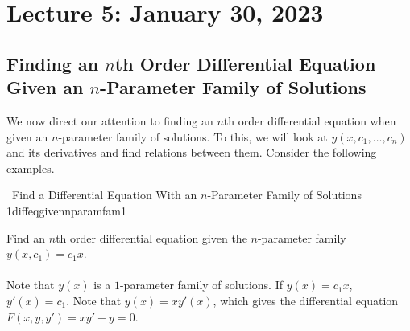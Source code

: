     \pagebreak

\section{Lecture 5: January 30, 2023}

    \DOTHISLATER

    \subsection{Finding an \(n\)th Order Differential Equation Given an \(n\)-Parameter Family of Solutions}

        We now direct our attention to finding an \(n\)th order differential equation when given an \(n\)-parameter family of solutions. To this, we will look at \(y(x,c_1,\ldots,c_n)\) and its derivatives and find relations between them. Consider the following examples.
        \begin{example}{\Difficulty\,\Difficulty\,\,Find a Differential Equation With an \(n\)-Parameter Family of Solutions 1}{diffeqgivennparamfam1}
            
            Find an \(n\)th order differential equation given the \(n\)-parameter family \(y(x,c_1)=c_1x\).
            \\
            \\
            Note that \(y(x)\) is a \(1\)-parameter family of solutions. If \(y(x)=c_1x\), \(y'(x)=c_1\). Note that \(y(x)=xy'(x)\), which gives the differential equation \(F(x,y,y')=xy'-y=0\).

        \end{example}
